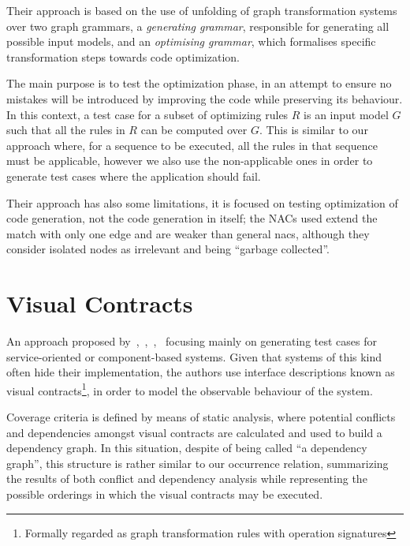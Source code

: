 Their approach is based on the use of unfolding of graph transformation systems~\cite{Ribeiro1996} over two graph grammars, a \textit{generating grammar}, responsible for generating all possible input models, and an \textit{optimising grammar}, which formalises specific transformation steps towards code optimization.

The main purpose is to test the optimization phase, in an attempt to ensure no mistakes will be introduced by improving the code while preserving its behaviour. In this context, a test case for a subset of optimizing rules $R$ is an input model $G$ such that all the rules in $R$ can be computed over $G$. This is similar to our approach where, for a sequence to be executed, all the rules in that sequence must be applicable, however we also use the non-applicable ones in order to generate test
cases where the application should fail.

Their approach has also some limitations, it is focused on testing optimization of code generation, not the code generation in itself; the NACs used extend the match with only one edge and are weaker than general nacs, although they consider isolated nodes as irrelevant and being ``garbage collected''.



\section{Visual Contracts}

An approach proposed by~\cite{Heckel2011},~\cite{Khan2012},~\cite{Khan2012a},~\cite{Runge2013} focusing mainly on generating test cases for service-oriented or component-based systems. Given that systems of this kind often hide their implementation, the authors use interface descriptions known as visual contracts\footnote{ Formally regarded as graph transformation rules with operation signatures}, in order to model the observable behaviour of the system.

Coverage criteria is defined by means of static analysis, where potential conflicts and dependencies amongst visual contracts are calculated and used to build a dependency graph. In this situation, despite of being called ``a dependency graph'', this structure is rather similar to our occurrence relation, summarizing the results of both conflict and dependency analysis while representing the possible orderings in which the visual contracts may be executed.

